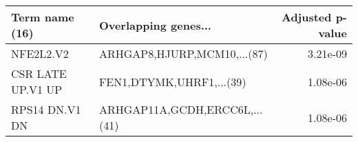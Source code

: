 \begin{tabular}{llr}
\toprule
   Term name (16) &          Overlapping genes... &  Adjusted p-value \\
\midrule
        NFE2L2.V2 &   ARHGAP8,HJURP,MCM10,...(87) &          3.21e-09 \\
CSR LATE UP.V1 UP &      FEN1,DTYMK,UHRF1,...(39) &          1.08e-06 \\
   RPS14 DN.V1 DN & ARHGAP11A,GCDH,ERCC6L,...(41) &          1.08e-06 \\
\bottomrule
\end{tabular}
